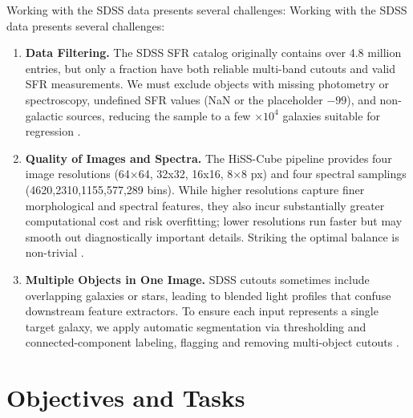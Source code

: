 \documentclass[english,bachelor,oneside]{ctufit-thesis}
\begin{document}
Working with the SDSS data presents several challenges:
Working with the SDSS data presents several challenges:
\begin{enumerate}
  \item \textbf{Data Filtering.} The SDSS SFR catalog originally contains over 4.8 million entries, but only a fraction have both reliable multi-band cutouts and valid SFR measurements. We must exclude objects with missing photometry or spectroscopy, undefined SFR values (NaN or the placeholder $-99$), and non-galactic sources, reducing the sample to a few $\times10^4$ galaxies suitable for regression \cite{SDSS_SFR_DOC}.
  \item \textbf{Quality of Images and Spectra.} The HiSS-Cube pipeline provides four image resolutions (64×64, 32x32, 16x16, 8×8 px) and four spectral samplings (4620,2310,1155,577,289 bins). While higher resolutions capture finer morphological and spectral features, they also incur substantially greater computational cost and risk overfitting; lower resolutions run faster but may smooth out diagnostically important details. Striking the optimal balance is non-trivial \cite{nadvornik2021hiss}.
  \item \textbf{Multiple Objects in One Image.} SDSS cutouts sometimes include overlapping galaxies or stars, leading to blended light profiles that confuse downstream feature extractors. To ensure each input represents a single target galaxy, we apply automatic segmentation via thresholding and connected-component labeling, flagging and removing multi-object cutouts \cite{sezgin2004survey,GonzalezWoods2008}.
\end{enumerate}

\section{Objectives and Tasks}
\end{document}
